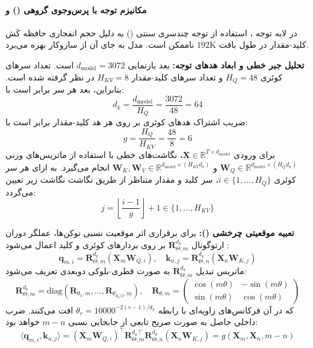 \paragraph*{مکانیزم توجه با پرس‌وجوی گروهی () و }
در لایه توجه ، استفاده از توجه چندسری سنتی () به دلیل حجم انفجاری حافظه کَش کلید-مقدار در طول بافت $192\text{K}$ ناممکن است. مدل به جای آن از سازوکار  \cite{ainslie2023gqa} بهره می‌برد.

\textbf{تحلیل جبر خطی و ابعاد هدهای توجه:}
بعد بازنمایی $d_{\text{model}} = 3072$ است. تعداد سرهای کوئری $H_Q = 48$ و تعداد سرهای کلید-مقدار $H_{KV} = 8$ در نظر گرفته شده است. بنابراین، بعد هر سر برابر است با:
\begin{equation}
    d_k = \frac{d_{\text{model}}}{H_Q} = \frac{3072}{48} = 64
\end{equation}
ضریب اشتراک هدهای کوئری بر روی هر هد کلید-مقدار برابر است با:
\begin{equation}
    g = \frac{H_Q}{H_{KV}} = \frac{48}{8} = 6
\end{equation}
برای ورودی $\mathbf{X} \in \mathbb{R}^{T \times d_{\text{model}}}$، نگاشت‌های خطی با استفاده از ماتریس‌های وزنی $\mathbf{W}_Q \in \mathbb{R}^{d_{\text{model}} \times (H_Q d_k)}$ و $\mathbf{W}_K, \mathbf{W}_V \in \mathbb{R}^{d_{\text{model}} \times (H_{KV} d_k)}$ انجام می‌گیرد. به ازای هر سر کوئری $i \in \{1, \dots, H_Q\}$، سر کلید و مقدار متناظر از طریق نگاشت نگاشت زیر تعیین می‌گردد:
\begin{equation}
    j = \left\lfloor \frac{i-1}{g} \right\rfloor + 1 \in \{1, \dots, H_{KV}\}
\end{equation}

\textbf{تعبیه موقعیتی چرخشی ():}
برای برقراری اثر موقعیت نسبی توکن‌ها، عملگر دوران ارتوگونال $\mathbf{R}_{\Theta, m}^{d_k}$ بر روی بردارهای کوئری و کلید اعمال می‌شود \cite{su2024roformer}:
\begin{equation}
    \mathbf{q}_{m, i} = \mathbf{R}_{\Theta, m}^{d_k} (\mathbf{X}_m \mathbf{W}_{Q, i}), \quad \mathbf{k}_{n, j} = \mathbf{R}_{\Theta, n}^{d_k} (\mathbf{X}_n \mathbf{W}_{K, j})
\end{equation}
ماتریس تبدیل $\mathbf{R}_{\Theta, m}^{d_k}$ به صورت قطری-بلوکی دوبعدی تعریف می‌شود:
\begin{equation}
    \mathbf{R}_{\Theta, m}^{d_k} = \text{diag}\left( \mathbf{R}_{\theta_1, m}, \dots, \mathbf{R}_{\theta_{d_k/2}, m} \right), \quad \mathbf{R}_{\theta, m} = \begin{pmatrix} \cos(m\theta) & -\sin(m\theta) \\ \sin(m\theta) & \cos(m\theta) \end{pmatrix}
\end{equation}
که در آن فرکانس‌های زاویه‌ای با رابطه $\theta_r = 10000^{-2(r-1)/d_k}$ افت می‌کنند. ضرب داخلی حاصل به صورت صریح تابعی از جابجایی نسبی $m-n$ خواهد بود:
\begin{equation}
    \langle \mathbf{q}_{m, i}, \mathbf{k}_{n, j} \rangle = (\mathbf{X}_m \mathbf{W}_{Q, i})^\top \mathbf{R}_{\Theta, m}^{d_k \top} \mathbf{R}_{\Theta, n}^{d_k} (\mathbf{X}_n \mathbf{W}_{K, j}) = g(\mathbf{X}_m, \mathbf{X}_n, m-n)
\end{equation}

